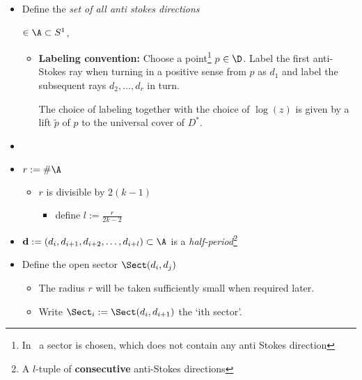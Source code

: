 \begin{defn}
  \begin{itemize}
    \item Define the \emph{set of all anti stokes directions}
      $\in\A\subset S^1$,
      \begin{itemize}
        \item
          \textbf{Labeling convention:}
          Choose a point\footnote{In~\cite{thboalch} a sector is chosen, which
          does not contain any anti Stokes direction}
          \textcolor{yellow!60!black}{$p$} $\in \D$.
          Label the first anti-Stokes ray when turning in a positive sense from
          $p$ as $d_1$ and label the subsequent rays $d_2,\dots,d_r$ in turn.
          \begin{rem}
            The choice of labeling together with the choice of $\log(z)$ is
            given by a lift $\tilde p$ of $p$ to the universal cover of $D^*$.
          \end{rem}
      \end{itemize}
  \end{itemize}
  \begin{itemize}
    \item
    \item $r:=\#\A$
      \begin{itemize}
        \item $r$ is divisible by $2(k-1)$
          \begin{itemize}
            \item define $l:=\frac{r}{2k-2}$
          \end{itemize}
      \end{itemize}
    \item $\textbf{d}:=(d_i,d_{i+1},d_{i+2},\dots,d_{i+l})\subset\A$ is a
      \emph{half-period}\footnote{A $l$-tuple of \textbf{consecutive}
      anti-Stokes directions}
    \item Define the open sector $\Sect(d_i,d_j)$
      \begin{itemize}
        \item The radius \textcolor{green!40!black}{$r$} will be taken
          sufficiently small when required later.
        \item Write $\Sect_i:= \Sect(d_i,d_{i+1})$ the ‘ith sector’.
          \begin{itemize}

\end{itemize}
\end{itemize}
\end{itemize}
\end{defn}
